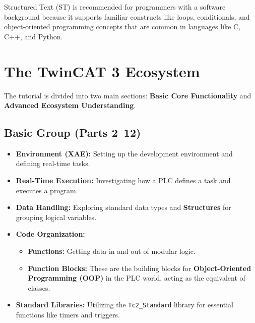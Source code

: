 \documentclass[11pt,a4paper]{article}
\begin{document}
\begin{notebox}
Structured Text (ST) is recommended for programmers with a software background because it supports familiar constructs like loops, conditionals, and object-oriented programming concepts that are common in languages like C, C++, and Python.
\end{notebox}

\section{The TwinCAT 3 Ecosystem}

The tutorial is divided into two main sections: \textbf{Basic Core Functionality} and \textbf{Advanced Ecosystem Understanding}.

\subsection{Basic Group (Parts 2--12)}

\begin{itemize}[leftmargin=*]
    \item \textbf{Environment (XAE):} Setting up the development environment and defining real-time tasks.
    
    \item \textbf{Real-Time Execution:} Investigating how a PLC defines a task and executes a program.
    
    \item \textbf{Data Handling:} Exploring standard data types and \textbf{Structures} for grouping logical variables.
    
    \item \textbf{Code Organization:}
    \begin{itemize}
        \item \textbf{Functions:} Getting data in and out of modular logic.
        \item \textbf{Function Blocks:} These are the building blocks for \textbf{Object-Oriented Programming (OOP)} in the PLC world, acting as the equivalent of classes.
    \end{itemize}
    
    \item \textbf{Standard Libraries:} Utilizing the \texttt{Tc2\_Standard} library for essential functions like timers and triggers.
\end{itemize}
\end{document}
